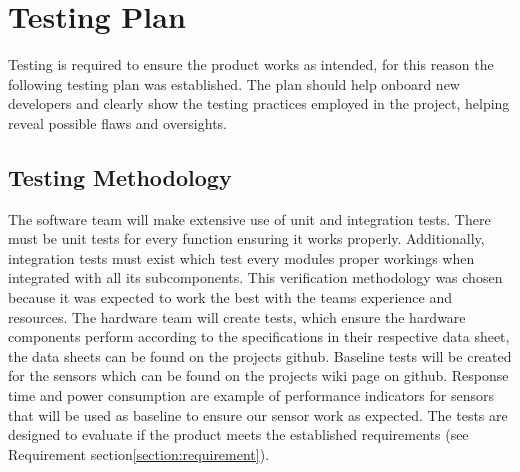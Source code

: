 \section{Testing Plan}
\label{section:testing_plan}

Testing is required to ensure the product works as intended, for this reason the following testing plan was established. The plan should help onboard new developers and clearly show the testing practices employed in the project, helping reveal possible flaws and oversights.

\subsection{Testing Methodology}

The software team will make extensive use of unit and integration tests. There must be unit tests for every function ensuring it works properly. Additionally, integration tests must exist which test every modules proper workings when integrated with all its subcomponents. This verification methodology was chosen because it was expected to work the best with the teams experience and resources.
The hardware team will create tests, which ensure the hardware components perform according to the specifications in their respective data sheet, the data sheets can be found on the projects github. Baseline tests will be created for the sensors which can be found on the projects wiki page on github. Response time and power consumption are example of performance indicators for sensors that will be used as baseline to ensure our sensor work as expected. 
The tests are designed to evaluate if the product meets the established requirements (see Requirement section\:\ref{section:requirement}).

